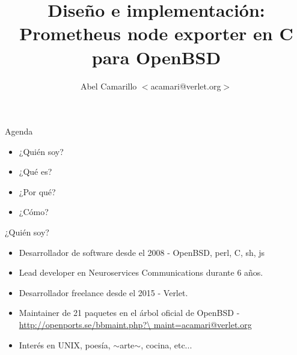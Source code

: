 \documentclass[11pt,spanish]{article}
\title{Diseño e implementación: Prometheus node exporter en C para OpenBSD}
\author{Abel Camarillo $<$acamari@verlet.org$>$}
\newcommand{\rowsp}[1][1em]{\vspace{#1}}
\newcommand{\hone}[1]{{\rowsp[0.3em]\noindent\Large #1 \rowsp[0.3em]}}
\newcommand{\myitm}[1]{\begin{itemize}#1\end{itemize}}
\begin{document}
\maketitle
\thispagestyle{empty}

\newpage

\hone{Agenda}

\myitm{
	\item ¿Quién soy?
	\item ¿Qué es?
	\item ¿Por qué?
	\item ¿Cómo?
}

\newpage %
\hone{¿Quién soy?}
\begin{Row}
\begin{Cell}{2}
\myitm{
	\item Desarrollador de software desde el 2008 - OpenBSD, perl, C, sh, js
	\item Lead developer en Neuroservices Communications durante 6 años.
	\item Desarrollador freelance desde el 2015 - Verlet.
	\item Maintainer de 21 paquetes en el árbol oficial de OpenBSD -
	\href{http://openports.se/bbmaint.php?maint=acamari@verlet.org}{
	      http://openports.se/bbmaint.php?\textbackslash{} maint=acamari@verlet.org}
	\item Interés en UNIX, poesía, $\sim$arte$\sim$, cocina, etc...
}
\end{Cell}


\end{Row}
\end{document}
